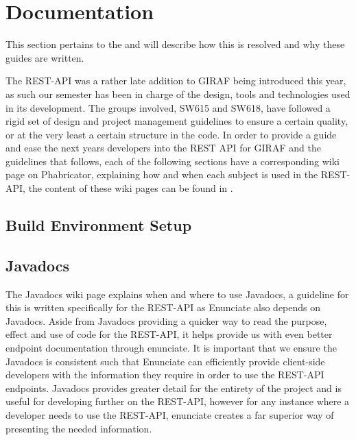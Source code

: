 \section{Documentation}
This section pertains to the  and will describe how this is resolved and why these guides are written.

The REST-API was a rather late addition to GIRAF being introduced this year, as such our semester has been in charge of the design, tools and technologies used in its development.
The groups involved, SW615 and SW618, have followed a rigid set of design and project management guidelines to ensure a certain quality, or at the very least a certain structure in the code.
In order to provide a guide and ease the next years developers into the REST API for GIRAF and the guidelines that follows, each of the following sections have a corresponding wiki page on Phabricator, explaining how and when each subject is used in the REST-API, the content of these wiki pages can be found in .

\subsection{Build Environment Setup}
\subsection{Javadocs}
The Javadocs wiki page explains when and where to use Javadocs, a guideline for this is written specifically for the REST-API as Enunciate also depends on Javadocs.
Aside from Javadocs providing a quicker way to read the purpose, effect and use of code for the REST-API, it helps provide us with even better endpoint documentation through enunciate.
It is important that we ensure the Javadocs is consistent such that Enunciate can efficiently provide client-side developers with the information they require in order to use the REST-API endpoints.
Javadocs provides greater detail for the entirety of the project and is useful for developing further on the REST-API, however for any instance where a developer needs to use the REST-API, enunciate creates a far superior way of presenting the needed information.
    
